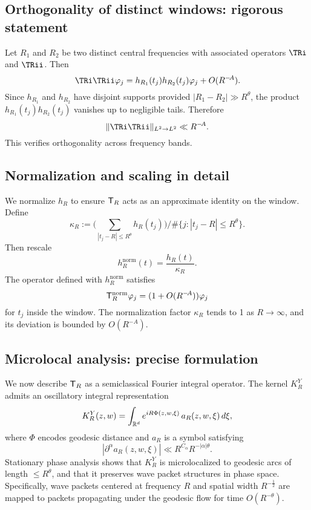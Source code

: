 \subsection{Orthogonality of distinct windows: rigorous statement}\label{subsec:proj-orthog-proof}

Let $R_1$ and $R_2$ be two distinct central frequencies with associated operators $\TRi$ and $\TRii$. Then
\[
\TRi \TRii \varphi_j = h_{R_1}(t_j)h_{R_2}(t_j)\varphi_j + O(R^{-\!A}).
\]
Since $h_{R_1}$ and $h_{R_2}$ have disjoint supports provided $|R_1-R_2|\gg R^\theta$, the product $h_{R_1}(t_j)h_{R_2}(t_j)$ vanishes up to negligible tails. Therefore
\[
\|\TRi\TRii\|_{L^2\to L^2} \ll R^{-\!A}.
\]
This verifies orthogonality across frequency bands.

\subsection{Normalization and scaling in detail}\label{subsec:proj-normalize-detail}

We normalize $h_R$ to ensure $\mathsf{T}_R$ acts as an approximate identity on the window. Define
\[
\kappa_R := \Big(\sum_{|t_j-R|\le R^\theta} h_R(t_j)\Big) \Big/ \#\{j:|t_j-R|\le R^\theta\}.
\]
Then rescale
\[
h_R^{\mathrm{norm}}(t) = \frac{h_R(t)}{\kappa_R}.
\]
The operator defined with $h_R^{\mathrm{norm}}$ satisfies
\[
\mathsf{T}_R^{\mathrm{norm}} \varphi_j = (1+O(R^{-\!A}))\varphi_j
\]
for $t_j$ inside the window. The normalization factor $\kappa_R$ tends to 1 as $R\to\infty$, and its deviation is bounded by $O(R^{-\!A})$.

\subsection{Microlocal analysis: precise formulation}\label{subsec:proj-microlocal-proof}

We now describe $\mathsf{T}_R$ as a semiclassical Fourier integral operator. The kernel $K_R^Y$ admits an oscillatory integral representation
\[
K_R^Y(z,w) = \int_{\mathbb{R}^d} e^{iR\Phi(z,w,\xi)}\,a_R(z,w,\xi)\,d\xi,
\]
where $\Phi$ encodes geodesic distance and $a_R$ is a symbol satisfying
\[
|\partial^\alpha a_R(z,w,\xi)| \ll R^{C_\alpha}R^{-|\alpha|\theta}.
\]
Stationary phase analysis shows that $K_R^Y$ is microlocalized to geodesic arcs of length $\le R^\theta$, and that it preserves wave packet structures in phase space. Specifically, wave packets centered at frequency $R$ and spatial width $R^{-\tfrac12}$ are mapped to packets propagating under the geodesic flow for time $O(R^{-\theta})$.

